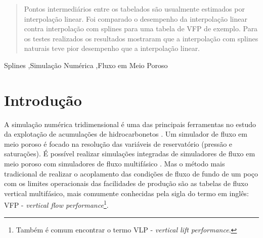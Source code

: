 \documentclass[final,5p]{elsarticle}
\numberwithin{equation}{section}
\begin{document}
\begin{frontmatter}
\begin{abstract}
    Pontos intermediários entre os tabelados são usualmente estimados por interpolação linear. Foi comparado o desempenho da interpolação linear contra interpolação com splines para uma tabela de VFP de exemplo. Para os testes realizados os resultados mostraram que a interpolação com splines naturais teve pior desempenho que a interpolação linear.

\end{abstract}




\begin{keyword}
    Splines \sep Simulação Numérica \sep Fluxo em Meio Poroso



\end{keyword}

\end{frontmatter}


\section{Introdução}

    A simulação numérica tridimensional é uma das principais ferramentas no estudo da explotação de acumulações de hidrocarbonetos \cite{ReservoirSimulationErtekin}. Um simulador de fluxo em meio poroso é focado na resolução das variáveis de reservatório (pressão e saturações). É possível realizar simulações integradas de simuladores de fluxo em meio poroso com simuladores de fluxo multifásico \cite{10.2118/195477-MS}. Mas o método mais tradicional de realizar o acoplamento das condições de fluxo de fundo de um poço com os limites operacionais das facilidades de produção são as tabelas de fluxo vertical multifásico, mais comumente conhecidas pela sigla do termo em inglês: VFP - \emph{vertical flow performance}\footnote{Também é comum encontrar o termo VLP - \emph{vertical lift performance}.}.
\end{document}
